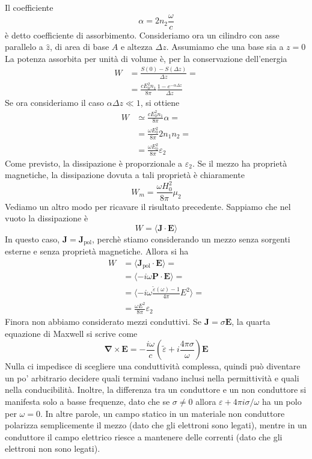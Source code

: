 \documentclass[a4paper,11pt]{book}
\let\oldnabla\nabla
\renewcommand{\nabla}{\vec{\oldnabla}}
\renewcommand{\vec}[1]{\mathbf{#1}}
\theoremstyle{theorem}
\theoremstyle{definition}
\begin{document}
Il coefficiente
\[\alpha=2n_2\frac{\omega}{c}\]
è detto coefficiente di assorbimento. Consideriamo ora un cilindro con asse parallelo a $\hat{z}$, di area di base $A$ e altezza $\Delta z$. Assumiamo che una base sia a $z=0$ La potenza assorbita per unità di volume è, per la conservazione dell'energia
\begin{align*}
	W&=\frac{S(0)-S(\Delta z)}{\Delta z}=\\&=\frac{cE_0^2n_1}{8\pi}\frac{1-e^{-\alpha\Delta z
	}}{\Delta z}
\end{align*}
Se ora consideriamo il caso $\alpha\Delta z\ll1$, si ottiene
\begin{align*}
	W&\simeq\frac{cE_0^2n_1}{8\pi}\alpha=\\&=\frac{\omega E_0^2}{8\pi}2n_1n_2=\\&=\frac{\omega E_0^2}{8\pi}\varepsilon_2
\end{align*}
Come previsto, la dissipazione è proporzionale a $\varepsilon_2$. Se il mezzo ha proprietà magnetiche, la dissipazione dovuta a tali proprietà è chiaramente
\[W_m=\frac{\omega H_0^2}{8\pi}\mu_2\]
Vediamo un altro modo per ricavare il risultato precedente. Sappiamo che nel vuoto la dissipazione è
\[W=\langle\vec{J}\cdot\vec{E}\rangle\]
In questo caso, $\vec{J}=\vec{J}_\textrm{pol}$, perchè stiamo considerando un mezzo senza sorgenti esterne e senza proprietà magnetiche. Allora si ha
\begin{align*}
	W&=\langle\vec{J}_\textrm{pol}\cdot\vec{E}\rangle=\\&=\langle-i\omega\vec{P}\cdot\vec{E}\rangle=\\&=\langle-i\omega\frac{\tilde{\varepsilon}(\omega)-1}{4\pi}E^2\rangle=\\&=\frac{\omega E^2}{8\pi}\varepsilon_2
\end{align*}
Finora non abbiamo considerato mezzi conduttivi. Se $\vec{J}=\sigma\vec{E}$, la quarta equazione di Maxwell si scrive come
\[\nabla\times\vec{E}=-\frac{i\omega}{c}\left(\tilde{\varepsilon}+i\frac{4\pi\sigma}{\omega}\right)\vec{E}\]
Nulla ci impedisce di scegliere una conduttività complessa, quindi può diventare un po' arbitrario decidere quali termini vadano inclusi nella permittività e quali nella conducibilità. Inoltre, la differenza tra un conduttore e un non conduttore si manifesta solo a basse frequenze, dato che se $\sigma\neq0$ allora $\varepsilon+4\pi i\sigma/\omega$ ha un polo per $\omega=0$. In altre parole, un campo statico in un materiale non conduttore polarizza semplicemente il mezzo (dato che gli elettroni sono legati), mentre in un conduttore il campo elettrico riesce a mantenere delle correnti (dato che gli elettroni non sono legati).
\end{document}
